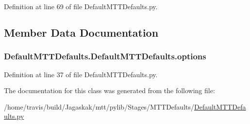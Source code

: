 Definition at line 69 of file Default\-M\-T\-T\-Defaults.\-py.



\subsection{Member Data Documentation}
\hypertarget{classDefaultMTTDefaults_1_1DefaultMTTDefaults_a733e1af4da36392ce6126d79c61aba0b}{
\subsubsection[{options}]{\setlength{\rightskip}{0pt plus 5cm}Default\-M\-T\-T\-Defaults.\-Default\-M\-T\-T\-Defaults.\-options}}\label{classDefaultMTTDefaults_1_1DefaultMTTDefaults_a733e1af4da36392ce6126d79c61aba0b}


Definition at line 37 of file Default\-M\-T\-T\-Defaults.\-py.



The documentation for this class was generated from the following file\-:\begin{DoxyCompactItemize}
\item 
/home/travis/build/\-Jagaskak/mtt/pylib/\-Stages/\-M\-T\-T\-Defaults/\hyperlink{DefaultMTTDefaults_8py}{Default\-M\-T\-T\-Defaults.\-py}\end{DoxyCompactItemize}
